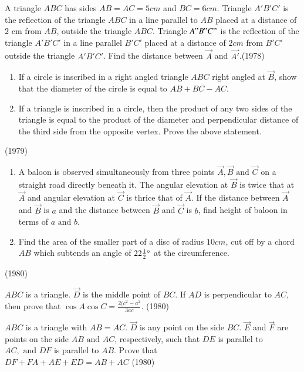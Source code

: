 \iffalse
\title{Properties of Triangles}
\author{EE24Btech11022 - Eshan sharma}
\section{subjective}
\fi
     \item A triangle $ABC$ has sides $AB=AC=5 cm$ and $BC =6 cm$. Triangle $A'B'C'$ is the reflection of the triangle $ABC$ in a line parallel to $AB$ placed at a distance of $2$ cm from $AB$, outside the triangle $ABC$. Triangle $A"B"C"$ is the reflection of the triangle $A'B'C'$ in a line parallel $B'C'$ placed at a distance of $2 cm$ from $B'C'$ outside the triangle $A'B'C'$. Find the distance between $\vec{A}$ and $\vec{A'}$.\hfill {(1978)}
     \item 
     \begin{enumerate}
     	\item If a circle is inscribed in a right angled triangle $ABC$ right angled at $\vec{B}$, show that the diameter of the circle is equal to $AB+BC-AC$.
     	\item If a triangle is inscribed in a circle, then the product of any two sides of the triangle is equal to the product of the diameter and perpendicular distance of the third side from the opposite vertex. Prove the above statement.
     \end{enumerate}
     \hfill {(1979)}
     \item
     \begin{enumerate}
     	\item A baloon is observed simultaneously from three points $\vec{A},\vec{B} \text{ and } \vec{C}$ on a straight road directly beneath it. The angular elevation at $\vec{B}$ is twice that at $\vec{A}$ and angular elevation at $\vec{C}$ is thrice that of $\vec{A}$. If the distance between $\vec{A}$ and $\vec{B}$ is $a$ and the distance between $\vec{B}$ and $\vec{C}$ is $b$, find height of baloon in terms of $a \text{ and } b$.
     	\item Find the area of the smaller part of a disc of radius $10 cm$, cut off by a chord $AB$ which subtends an angle of $22\frac{1}{2} \degree$ at the circumference.
     \end{enumerate}
     \hfill {(1980)}
     \item $ABC$ is a triangle. $\vec{D}$ is the middle point of $BC$. If $AD$ is perpendicular to $AC$, then prove that $\cos{A}\cos{C} = \frac{2(c^{2}-a^{2}}{3ac}$.
     \hfill {(1980)}
     \item $ABC$ is a triangle with $AB=AC$. $\vec{D}$ is any point on the side $BC$. $\vec{E}$ and $\vec{F}$ are points on the side $AB \text{ and } AC$, respectively, such that $DE$ is parallel to $AC, \text{ and } DF$ is parallel to $AB$. Prove that \\
     $DF + FA + AE + ED = AB+AC$
     \hfill {(1980)} 
